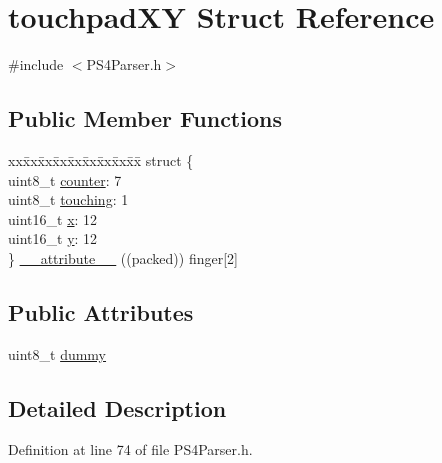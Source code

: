 \hypertarget{structtouchpad_x_y}{\section{touchpad\-X\-Y \-Struct \-Reference}
\label{structtouchpad_x_y}
}


{\ttfamily \#include $<$\-P\-S4\-Parser.\-h$>$}

\subsection*{\-Public \-Member \-Functions}
\begin{DoxyCompactItemize}
\item 
\begin{tabbing}
xx\=xx\=xx\=xx\=xx\=xx\=xx\=xx\=xx\=\kill
struct \{\\
\>uint8\_t \hyperlink{structtouchpad_x_y_ae52c34f2e6e66933e06b2f3448badcf0}{counter}: 7\\
\>uint8\_t \hyperlink{structtouchpad_x_y_a2c078e99c3b96303e6b6a60e2f36acc5}{touching}: 1\\
\>uint16\_t \hyperlink{structtouchpad_x_y_a1c38a3e4161b1495b4d8ce37124c72a5}{x}: 12\\
\>uint16\_t \hyperlink{structtouchpad_x_y_ac4ceb26c0ebba1c5a2691a1ecdb7dbae}{y}: 12\\
\} \hyperlink{structtouchpad_x_y_a2d789be028e75f23caa7c1767eef3103}{\_\_attribute\_\_} ((packed)) finger\mbox{[}2\mbox{]}\\

\end{tabbing}\end{DoxyCompactItemize}
\subsection*{\-Public \-Attributes}
\begin{DoxyCompactItemize}
\item 
uint8\-\_\-t \hyperlink{structtouchpad_x_y_aad3a6094ac41933907969856dfb93e15}{dummy}
\end{DoxyCompactItemize}


\subsection{\-Detailed \-Description}


\-Definition at line 74 of file \-P\-S4\-Parser.\-h.




